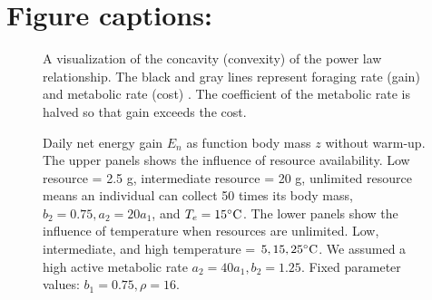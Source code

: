 \section*{Figure captions:}
\begin{figure}[H]
\begin{center}
\caption{
	A visualization of the concavity (convexity) of the power law relationship.
	The black and gray lines represent foraging rate (gain) and  metabolic rate (cost) .
	The coefficient of the metabolic rate is halved so that gain exceeds the cost.
}
\label{fig1}
\end{center}
\end{figure}
%
\begin{figure}[H]
\begin{center}
\caption{
      Daily net energy gain  $E_n$ as function body mass $z$ without warm-up.
	The upper panels shows the influence of resource availability.
	Low resource = 2.5 g, intermediate resource = 20 g, unlimited resource means an individual can collect 50 times its body mass, $b_2 = 0.75, a_2 = 20 a_1$, and $T_e = 15 ^{\circ} \rm{C}$. 
	The lower panels show the influence of temperature when resources are unlimited.
	Low, intermediate, and high temperature = $5, 15, 25 ^{\circ} \rm{C}$.
	We assumed a high active metabolic rate $a_2 = 40 a_1, b_2  = 1.25$.
	Fixed parameter values: $b_1 = 0.75, \rho = 16$.
}
\label{fig2}
\end{center}
\end{figure}
